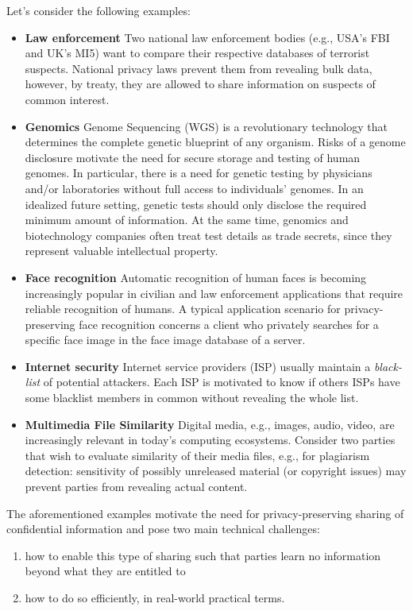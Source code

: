 \documentclass[dvips,12pt]{article}
\begin{document}
Let's consider the following examples:
\begin{itemize}
\item \textbf{Law enforcement} Two national law enforcement bodies (e.g., USA’s FBI and UK’s MI5) want to compare their respective
databases of terrorist suspects. National privacy laws prevent them from revealing bulk data, however,
by treaty, they are allowed to share information on suspects of common interest.
\item \textbf{Genomics} Genome Sequencing (WGS) is a revolutionary technology that determines the complete genetic blueprint of any organism. Risks of a genome disclosure motivate the need for secure storage and testing of human genomes. In particular, there is a need for genetic testing by physicians and/or laboratories without full access to individuals' genomes. In an idealized future setting, genetic tests should only disclose the required minimum amount of information. At the same time, genomics and biotechnology companies often treat test details as trade secrets, since they represent valuable intellectual property.
\item \textbf{Face recognition} Automatic recognition of human faces is becoming increasingly popular in civilian and law enforcement applications that require reliable recognition of humans. A typical application scenario for privacy-preserving face recognition concerns a client who privately searches for a specific face image in the face image database of a server.
\item \textbf{Internet security} Internet service providers (ISP) usually maintain a \emph{black-list} of potential attackers. Each ISP is motivated to know if others ISPs have some blacklist members in common without revealing the whole list.
\item \textbf{Multimedia File Similarity} Digital media, e.g., images, audio, video, are increasingly relevant in today’s computing ecosystems. Consider two parties that wish to evaluate similarity of their media files, e.g., for plagiarism detection: sensitivity of possibly unreleased material (or copyright issues) may prevent parties from revealing actual content. 
\end{itemize} 

The aforementioned examples motivate the need for privacy-preserving sharing of confidential information
and pose two main technical challenges: 
\begin{enumerate}
\item how to enable this type of sharing such that parties learn no information beyond what they are entitled to
\item how to do so efficiently, in real-world practical terms.
\end{enumerate} 
\end{document}
